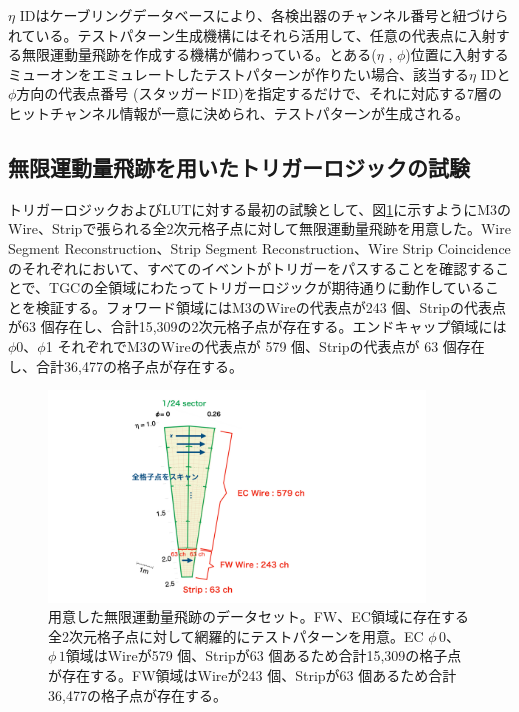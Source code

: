 
$\eta$ IDはケーブリングデータベースにより、各検出器のチャンネル番号と紐づけられている。テストパターン生成機構にはそれら活用して、任意の代表点に入射する無限運動量飛跡を作成する機構が備わっている。とある($\eta$ , $\phi$)位置に入射するミューオンをエミュレートしたテストパターンが作りたい場合、該当する$\eta$ IDと$\phi$方向の代表点番号 (スタッガードID)を指定するだけで、それに対応する7層のヒットチャンネル情報が一意に決められ、テストパターンが生成される。


\subsection{無限運動量飛跡を用いたトリガーロジックの試験}
トリガーロジックおよびLUTに対する最初の試験として、図\ref{InfMomentum}に示すようにM3のWire、Stripで張られる全2次元格子点に対して無限運動量飛跡を用意した。Wire Segment Reconstruction、Strip Segment Reconstruction、Wire Strip Coincidenceのそれぞれにおいて、すべてのイベントがトリガーをパスすることを確認することで、TGCの全領域にわたってトリガーロジックが期待通りに動作していることを検証する。フォワード領域にはM3のWireの代表点が243 個、Stripの代表点が63 個存在し、合計15,309の2次元格子点が存在する。エンドキャップ領域には$\phi$0、$\phi$1 それぞれでM3のWireの代表点が 579 個、Stripの代表点が 63 個存在し、合計36,477の格子点が存在する。

\begin{figure} 
\centering
\includegraphics[width=10cm]{fig/Test/InfMomentum.pdf}
\caption[用意した無限運動量飛跡のデータセット]{用意した無限運動量飛跡のデータセット。FW、EC領域に存在する全2次元格子点に対して網羅的にテストパターンを用意。EC $\phi\,0$、$\phi\,1$領域はWireが579 個、Stripが63 個あるため合計15,309の格子点が存在する。FW領域はWireが243 個、Stripが63 個あるため合計36,477の格子点が存在する。}
\label{InfMomentum}
\end{figure}

